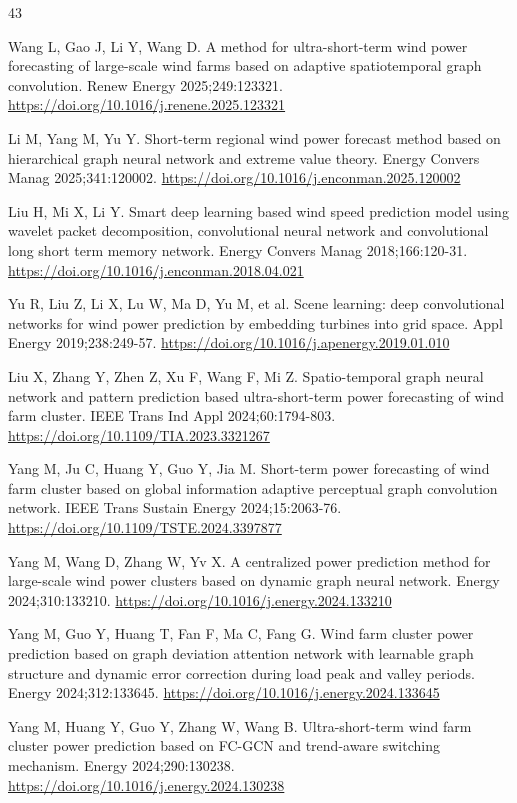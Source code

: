 \begin{thebibliography}{43}

Wang L, Gao J, Li Y, Wang D. A method for ultra-short-term wind power forecasting of large-scale wind farms based on adaptive spatiotemporal graph convolution. Renew Energy 2025;249:123321. \url{https://doi.org/10.1016/j.renene.2025.123321}

Li M, Yang M, Yu Y. Short-term regional wind power forecast method based on hierarchical graph neural network and extreme value theory. Energy Convers Manag 2025;341:120002. \url{https://doi.org/10.1016/j.enconman.2025.120002}

Liu H, Mi X, Li Y. Smart deep learning based wind speed prediction model using wavelet packet decomposition, convolutional neural network and convolutional long short term memory network. Energy Convers Manag 2018;166:120-31. \url{https://doi.org/10.1016/j.enconman.2018.04.021}

Yu R, Liu Z, Li X, Lu W, Ma D, Yu M, et al. Scene learning: deep convolutional networks for wind power prediction by embedding turbines into grid space. Appl Energy 2019;238:249-57. \url{https://doi.org/10.1016/j.apenergy.2019.01.010}

Liu X, Zhang Y, Zhen Z, Xu F, Wang F, Mi Z. Spatio-temporal graph neural network and pattern prediction based ultra-short-term power forecasting of wind farm cluster. IEEE Trans Ind Appl 2024;60:1794-803. \url{https://doi.org/10.1109/TIA.2023.3321267}

Yang M, Ju C, Huang Y, Guo Y, Jia M. Short-term power forecasting of wind farm cluster based on global information adaptive perceptual graph convolution network. IEEE Trans Sustain Energy 2024;15:2063-76. \url{https://doi.org/10.1109/TSTE.2024.3397877}

Yang M, Wang D, Zhang W, Yv X. A centralized power prediction method for large-scale wind power clusters based on dynamic graph neural network. Energy 2024;310:133210. \url{https://doi.org/10.1016/j.energy.2024.133210}

Yang M, Guo Y, Huang T, Fan F, Ma C, Fang G. Wind farm cluster power prediction based on graph deviation attention network with learnable graph structure and dynamic error correction during load peak and valley periods. Energy 2024;312:133645. \url{https://doi.org/10.1016/j.energy.2024.133645}

Yang M, Huang Y, Guo Y, Zhang W, Wang B. Ultra-short-term wind farm cluster power prediction based on FC-GCN and trend-aware switching mechanism. Energy 2024;290:130238. \url{https://doi.org/10.1016/j.energy.2024.130238}


\end{thebibliography}
